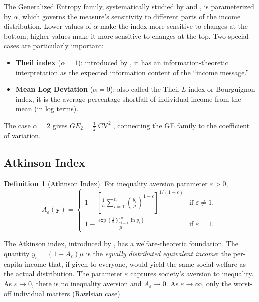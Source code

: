 \documentclass[12pt]{article}
\theoremstyle{plain}
\theoremstyle{definition}
\newtheorem{definition}[theorem]{Definition}
\theoremstyle{remark}
\newcommand{\bfy}{\mathbf{y}}
\begin{document}
The Generalized Entropy family, systematically studied by \citet{Shorrocks1980} and \citet{Cowell1977} \citep[see also][]{Cowell2011}, is parameterized by $\alpha$, which governs the measure's sensitivity to different parts of the income distribution.
Lower values of $\alpha$ make the index more sensitive to changes at the bottom; higher values make it more sensitive to changes at the top.
Two special cases are particularly important:
\begin{itemize}
    \item \textbf{Theil index} ($\alpha = 1$): introduced by \citet{Theil1967}, it has an information-theoretic interpretation as the expected information content of the ``income message.''
    \item \textbf{Mean Log Deviation} ($\alpha = 0$): also called the Theil-$L$ index or Bourguignon index, it is the average percentage shortfall of individual income from the mean (in log terms).
\end{itemize}

The case $\alpha = 2$ gives $GE_2 = \frac{1}{2}\operatorname{CV}^2$, connecting the GE family to the coefficient of variation.

\subsection{Atkinson Index}\label{sec:atkinson}

\begin{definition}[Atkinson Index]
For inequality aversion parameter $\varepsilon > 0$,
\begin{equation}\label{eq:atkinson}
A_\varepsilon(\bfy) = \begin{cases}
\displaystyle 1 - \left[\frac{1}{n}\sum_{i=1}^n \left(\frac{y_i}{\mu}\right)^{1-\varepsilon}\right]^{1/(1-\varepsilon)} & \text{if } \varepsilon \neq 1, \\[1.5em]
\displaystyle 1 - \frac{\exp\!\left(\frac{1}{n}\sum_{i=1}^n \ln y_i\right)}{\mu} & \text{if } \varepsilon = 1.
\end{cases}
\end{equation}
\end{definition}

The Atkinson index, introduced by \citet{Atkinson1970}, has a welfare-theoretic foundation.
The quantity $y_e = (1 - A_\varepsilon)\mu$ is the \emph{equally distributed equivalent income}: the per-capita income that, if given to everyone, would yield the same social welfare as the actual distribution.
The parameter $\varepsilon$ captures society's aversion to inequality.
As $\varepsilon \to 0$, there is no inequality aversion and $A_\varepsilon \to 0$.
As $\varepsilon \to \infty$, only the worst-off individual matters (Rawlsian case).
\end{document}
